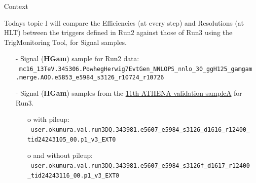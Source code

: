 \documentclass[aspectratio=1610,8pt]{beamer}					%
\begin{document}
\begin{frame}{Context}
    \begin{block}{Todays topic}
        I will compare the Efficiencies (at every step) and Resolutions (at HLT) between the triggers defined in Run2 against those of Run3 using the TrigMonitoring Tool,
        for Signal samples.
        \begin{itemize}
        \item[-]
            Signal (\textbf{HGam}) sample for Run2 data: \
            \texttt{\tiny{mc16\_13TeV.345306.PowhegHerwig7EvtGen\_NNLOPS\_nnlo\_30\_ggH125\_gamgam.merge.AOD.e5853\_e5984\_s3126\_r10724\_r10726}}
        \item[-]
            Signal (\textbf{HGam}) samples from the \href{https://its.cern.ch/jira/browse/ATR-22875}{11th ATHENA validation sampleA} for Run3.
            \begin{itemize}
            \item[o]
                with pileup: \ 
                \texttt{\tiny{user.okumura.val.run3DQ.343981.e5607\_e5984\_s3126\_d1616\_r12400\_tid24243105\_00.p1\_v3\_EXT0}} \
            \item[o]
                and without pileup: \ 
                \texttt{\tiny{user.okumura.val.run3DQ.343981.e5607\_e5984\_s3126f\_d1617\_r12400\_tid24243116\_00.p1\_v3\_EXT0}} \
            \end{itemize}
        \end{itemize}
    \end{block}
\end{frame}

\end{document}
